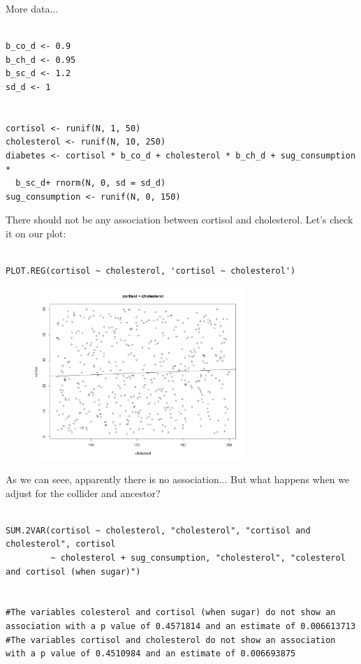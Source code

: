 \documentclass{article}
\begin{document}
More data...

\begin{lstlisting}

b_co_d <- 0.9
b_ch_d <- 0.95
b_sc_d <- 1.2
sd_d <- 1


cortisol <- runif(N, 1, 50)
cholesterol <- runif(N, 10, 250)
diabetes <- cortisol * b_co_d + cholesterol * b_ch_d + sug_consumption * 
  b_sc_d+ rnorm(N, 0, sd = sd_d)
sug_consumption <- runif(N, 0, 150)

\end{lstlisting}

There should not be any association between cortisol and cholesterol. Let's check it on our plot:

\begin{lstlisting}

PLOT.REG(cortisol ~ cholesterol, 'cortisol ~ cholesterol')

\end{lstlisting}



\begin{figure}[h]
\includegraphics[width=8cm]{PLOT_CORT_CHOL.png}
\centering
\end{figure}

As we can seee, apparently there is no association... But what happens when we adjust for the collider and ancestor?

\begin{lstlisting}

SUM.2VAR(cortisol ~ cholesterol, "cholesterol", "cortisol and cholesterol", cortisol 
         ~ cholesterol + sug_consumption, "cholesterol", "colesterol and cortisol (when sugar)")


#The variables colesterol and cortisol (when sugar) do not show an association with a p value of 0.4571814 and an estimate of 0.006613713 
#The variables cortisol and cholesterol do not show an association with a p value of 0.4510984 and an estimate of 0.006693875 

\end{lstlisting}
\end{document}
